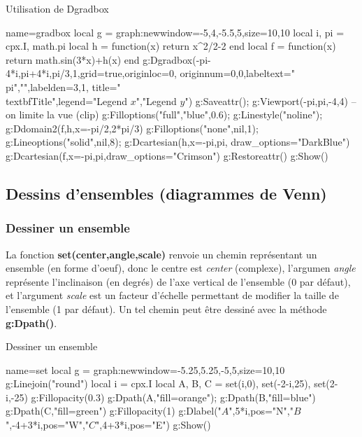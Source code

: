 \begin{demo}{Utilisation de Dgradbox}
\begin{luadraw}{name=gradbox}
local g = graph:new{window={-5,4,-5.5,5},size={10,10}}
local i, pi = cpx.I, math.pi
local h = function(x) return x^2/2-2 end
local f = function(x) return math.sin(3*x)+h(x) end
g:Dgradbox({-pi-4*i,pi+4*i,pi/3,1},{grid=true,originloc=0, originnum={0,0},labeltext={"\\pi",""},labelden={3,1}, title="\\textbf{Title}",legend={"Legend $x$","Legend $y$"}})
g:Saveattr(); g:Viewport(-pi,pi,-4,4) -- on limite la vue (clip)
g:Filloptions("full","blue",0.6); g:Linestyle("noline"); g:Ddomain2(f,h,{x={-pi/2,2*pi/3}})
g:Filloptions("none",nil,1); g:Lineoptions("solid",nil,8); g:Dcartesian(h,{x={-pi,pi}, draw_options="DarkBlue"})
g:Dcartesian(f,{x={-pi,pi},draw_options="Crimson"})
g:Restoreattr()
g:Show()
\end{luadraw}
\end{demo}

\subsection{Dessins d'ensembles (diagrammes de Venn)}

\subsubsection{Dessiner un ensemble}

La fonction \textbf{set(center,angle,scale)} renvoie un chemin représentant un ensemble (en forme d'oeuf), donc le centre est \emph{center} (complexe), l'argumen \emph{angle} représente l'inclinaison (en degrés) de l'axe vertical de l'ensemble (0 par défaut), et l'argument \emph{scale} est un facteur d'échelle permettant de modifier la taille de l'ensemble (1 par défaut). Un tel chemin peut être dessiné avec la méthode \textbf{g:Dpath()}.

\begin{demo}{Dessiner un ensemble}
\begin{luadraw}{name=set}
local g = graph:new{window={-5.25,5.25,-5,5},size={10,10}}
g:Linejoin("round")
local i = cpx.I
local A, B, C = set(i,0), set(-2-i,25), set(2-i,-25)
g:Fillopacity(0.3)
g:Dpath(A,"fill=orange"); g:Dpath(B,"fill=blue")
g:Dpath(C,"fill=green")
g:Fillopacity(1)
g:Dlabel("$A$",5*i,{pos="N"},"$B$",-4+3*i,{pos="W"},"$C$",4+3*i,{pos="E"})
g:Show()
\end{luadraw}
\end{demo}

